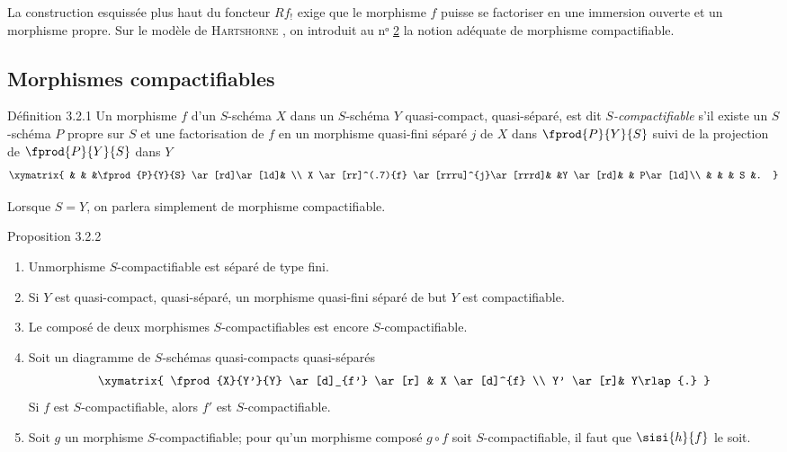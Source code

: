 \documentclass[10pt]{../fichiers-configuration-latex/smfart}
\begin{document}
La construction esquissée plus haut du foncteur $Rf_{!}$ exige que le
morphisme $f$ puisse se factoriser en une immersion ouverte et un
morphisme propre. Sur le modèle de \textsc{Hartshorne} \cite[III 8 p.~189]{SGA4-17:RD}, on
introduit au nᵒ \hyperref[XVII.sec2]{2} la notion adéquate de morphisme
compactifiable.

\subsection{Morphismes compactifiables}

\begin{enonce*}{Définition 3.2.1}
Un morphisme $f$ d'un $S$-schéma $X$ dans un $S$-schéma $Y$
quasi-compact, quasi-séparé, est dit \emph{$S$-compactifiable} s'il existe un
$S$-schéma $P$ propre sur $S$ et une factorisation de $f$ en un
morphisme quasi-fini séparé $j$ de $X$ dans $\fprod{P}{Y}{S}$ suivi de
la projection de $\fprod{P}{Y}{S}$ dans $Y$
\[
\xymatrix{
                                & &  &\fprod{P}{Y}{S} \ar[rd]\ar[ld]& \\
X \ar[rr]^(.7){f} \ar[rrru]^{j}\ar[rrrd]& &Y \ar[rd]&                & P\ar[ld]\\
                                & &  &       S        &.
}
\]
\end{enonce*}

Lorsque $S=Y$, on parlera simplement de morphisme compactifiable.

\begin{enonce*}{Proposition 3.2.2}
\begin{enumerate}
\renewcommand{\theenumi}{\roman{enumi}}
\renewcommand{\labelenumi}{(\theenumi)}
\item Un\pageoriginale morphisme $S$-compactifiable est séparé de type
fini.

\item Si $Y$ est quasi-compact, quasi-séparé, un morphisme quasi-fini
séparé de but $Y$ est compactifiable.

\item Le composé de deux morphismes $S$-compactifiables est encore
$S$-compactifiable.

\item Soit un diagramme de $S$-schémas quasi-compacts quasi-séparés
\[
\xymatrix{
\fprod{X}{Y'}{Y} \ar[d]_{f'} \ar[r] & X \ar[d]^{f}      \\
Y' \ar[r]& Y\rlap{.}
}
\]
Si $f$ est $S$-compactifiable, alors $f'$ est $S$-compactifiable.

\item Soit $g$ un morphisme $S$-compactifiable; pour qu'un morphisme
composé $g\circ f$ soit $S$-compactifiable, il faut que $\sisi{h}{f}$ le soit.
\end{enumerate}
\end{enonce*}
\end{document}
